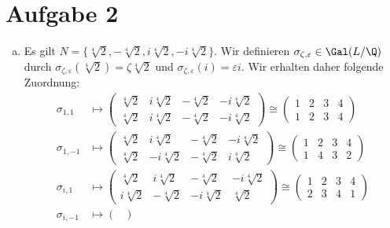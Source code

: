 \documentclass{article}
\begin{document}
    \section*{Aufgabe 2}
    \renewcommand{\epsilon}{\varepsilon}
    \begin{enumerate}[(a)]
        \item Es gilt $N = \{\sqrt[4]{2}, -\sqrt[4]{2}, i\sqrt[4]{2}, -i \sqrt[4]{2}\}$.
        Wir definieren $\sigma_{\zeta, \epsilon} \in \Gal(L/\Q)$ durch 
        $\sigma_{\zeta, \epsilon}(\sqrt[4]{2}) = \zeta \sqrt[4]{2}$ und $\sigma_{\zeta, \epsilon}(i) = \epsilon i$.
        Wir erhalten daher folgende Zuordnung:
        \begin{align*}
            \sigma_{1, 1} &\mapsto \begin{pmatrix}
                  \sqrt[4]{2}& i\sqrt[4]{2}&- \sqrt[4]{2}&-i\sqrt[4]{2}\\
                  \sqrt[4]{2}& i\sqrt[4]{2}&- \sqrt[4]{2}&-i\sqrt[4]{2}
            \end{pmatrix} \cong \begin{pmatrix}
                1 & 2 & 3 & 4\\
                1 & 2 & 3 & 4
            \end{pmatrix}\\
            \sigma_{1, -1} &\mapsto \begin{pmatrix}
                  \sqrt[4]{2}& i\sqrt[4]{2}&- \sqrt[4]{2}&-i\sqrt[4]{2}\\
                  \sqrt[4]{2}&-i\sqrt[4]{2}&- \sqrt[4]{2}& i\sqrt[4]{2}
            \end{pmatrix} \cong \begin{pmatrix}
                1 & 2 & 3 & 4\\
                1 & 4 & 3 & 2
            \end{pmatrix}\\
            \sigma_{i, 1} &\mapsto \begin{pmatrix}
                  \sqrt[4]{2}& i\sqrt[4]{2}&- \sqrt[4]{2}&-i\sqrt[4]{2}\\
                 i\sqrt[4]{2}&- \sqrt[4]{2}&-i\sqrt[4]{2}&  \sqrt[4]{2}
            \end{pmatrix} \cong \begin{pmatrix}
                1 & 2 & 3 & 4\\
                2 & 3 & 4 & 1
            \end{pmatrix}\\
            \sigma_{i, -1} &\mapsto \begin{pmatrix}

\end{pmatrix}
\end{align*}
\end{enumerate}
\end{document}
